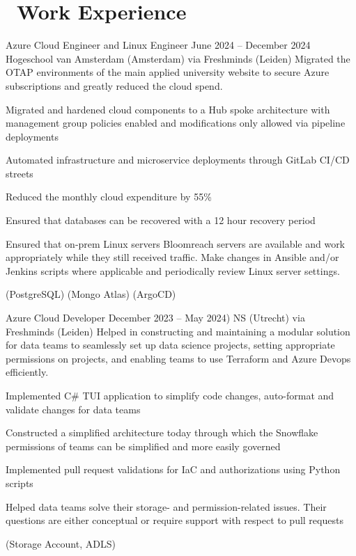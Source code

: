 \section{\faBriefcase\ Work Experience}

\workentry
  {Azure Cloud Engineer and Linux Engineer}
  {June 2024 -- December 2024}
  {Hogeschool van Amsterdam (Amsterdam) via Freshminds (Leiden)}
  {
    Migrated the OTAP environments of the main applied university website to secure Azure subscriptions and greatly reduced the cloud spend.\\
  }
  {
    \item Migrated and hardened cloud components to a Hub spoke architecture with management group policies enabled and modifications only allowed via pipeline deployments
    \item Automated infrastructure and microservice deployments through GitLab CI/CD streets
    \item Reduced the monthly cloud expenditure by 55\%
    \item Ensured that databases can be recovered with a 12 hour recovery period
    \item Ensured that on-prem Linux servers Bloomreach servers are available and work appropriately while they still received traffic. Make changes in Ansible and/or Jenkins scripts where applicable and periodically review Linux server settings.
  }
  {
     (PostgreSQL)
     (Mongo Atlas) 
     (ArgoCD)
  }

\workentry
  {Azure Cloud Developer}
  {December 2023 -- May 2024)}
  {NS (Utrecht) via Freshminds (Leiden)}
  {
    Helped in constructing and maintaining a modular solution for data teams to seamlessly set up data science projects, setting appropriate permissions on projects, and enabling teams to use Terraform and Azure Devops efficiently.\\
  }
  {
    \item Implemented C\# TUI application to simplify code changes, auto-format and validate changes for data teams
    \item Constructed a simplified architecture today through which the Snowflake permissions of teams can be simplified and more easily governed
    \item Implemented pull request validations for IaC and authorizations using Python scripts
    \item Helped data teams solve their storage- and permission-related issues. Their questions are either conceptual or require support with respect to pull requests
  }
  {
     (Storage Account, ADLS)
  }


